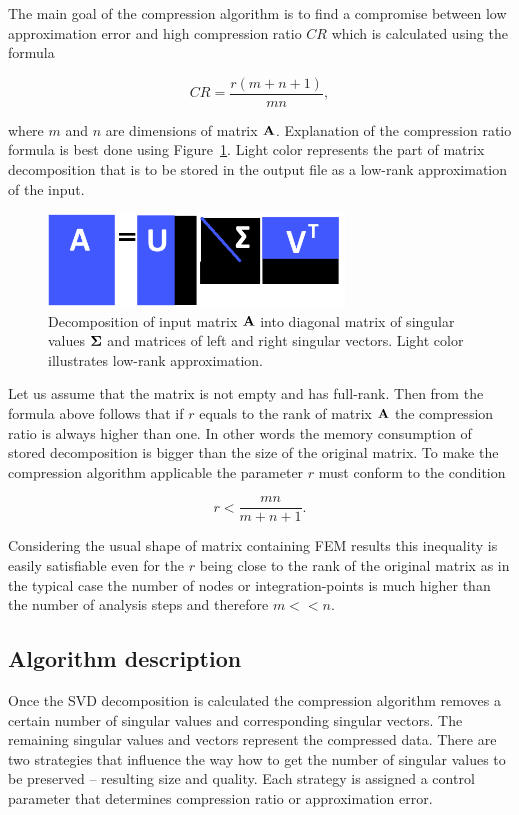 The main goal of the compression algorithm is to find a compromise between low approximation error and high compression ratio $CR$ which is calculated using the formula

\begin{equation}
CR=\frac{r(m+n+1)}{m n},
\label{eq:cr-def}
\end{equation}

\noindent
where $m$ and $n$ are dimensions of matrix $\mathbf{A}$. Explanation of the compression ratio formula is best done using Figure~\ref{fig:lowrank_svd}. Light color represents the part of matrix decomposition that is to be stored in the output file as a low-rank approximation of the input.

\begin{figure}[H]
\centering\includegraphics[width=0.7\textwidth]{figures/low_rank_decomposition_diagram}
\caption{Decomposition of input matrix $\mathbf{A}$ into diagonal matrix of singular values $\mathbf{\Sigma}$ and matrices of left and right singular vectors. Light color illustrates low-rank approximation.}
\label{fig:lowrank_svd}
\end{figure}

Let us assume that the matrix is not empty and has full-rank. Then from the formula above follows that if $r$ equals to the rank of matrix $\mathbf{A}$ the compression ratio is always higher than one. In other words the memory consumption of stored decomposition is bigger than the size of the original matrix. To make the compression algorithm applicable the parameter $r$ must conform to the condition

$$r<\frac{m n}{m+n+1}.$$

\noindent
Considering the usual shape of matrix containing FEM results this inequality is easily satisfiable even for the $r$ being close to the rank of the original matrix as in the typical case the number of nodes or integration-points is much higher than the number of analysis steps and therefore $m<<n$.

\subsection{Algorithm description}
Once the SVD decomposition is calculated the compression algorithm removes a certain number of singular values and corresponding singular vectors. The remaining singular values and vectors represent the compressed data. There are two strategies that influence the way how to get the number of singular values to be preserved -- resulting size and quality. Each strategy is assigned a control parameter that determines compression ratio or approximation error.

